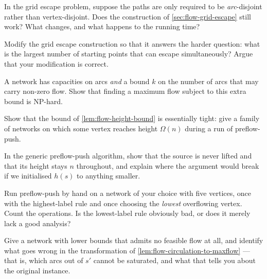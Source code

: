 \begin{exercise}
In the grid escape problem, suppose the paths are only required to be
\emph{arc}-disjoint rather than vertex-disjoint. Does the construction of
\cref{sec:flow-grid-escape} still work? What changes, and what happens to the
running time?
\end{exercise}

\begin{exercise}
Modify the grid escape construction so that it answers the harder question:
what is the largest number of starting points that can escape simultaneously?
Argue that your modification is correct.
\end{exercise}

\begin{exercise}
A network has capacities on arcs \emph{and} a bound $k$ on the number of arcs
that may carry non-zero flow. Show that finding a maximum flow subject to this
extra bound is NP-hard.
\end{exercise}

\begin{exercise}
Show that the bound of \cref{lem:flow-height-bound} is essentially tight: give a
family of networks on which some vertex reaches height $\Omega(n)$ during a run
of preflow-push.
\end{exercise}

\begin{exercise}
In the generic preflow-push algorithm, show that the source is never lifted and
that its height stays $n$ throughout, and explain where the argument would break
if we initialised $h(s)$ to anything smaller.
\end{exercise}

\begin{exercise}
Run preflow-push by hand on a network of your choice with five vertices, once
with the highest-label rule and once choosing the \emph{lowest} overflowing
vertex. Count the operations. Is the lowest-label rule obviously bad, or does it
merely lack a good analysis?
\end{exercise}

\begin{exercise}
Give a network with lower bounds that admits no feasible flow at all, and
identify what goes wrong in the transformation of
\cref{lem:flow-circulation-to-maxflow} --- that is, which arcs out of $s'$
cannot be saturated, and what that tells you about the original instance.
\end{exercise}

